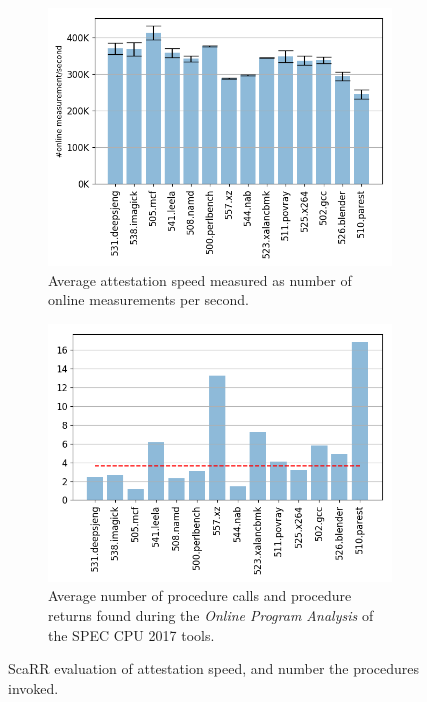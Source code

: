 \begin{figure}[t]
	\centering
	\begin{subfigure}[t]{0.45\textwidth}
		\centering
		\includegraphics[width=\textwidth]{fig_c4/attesetation_speed.png}
		\caption{Average attestation speed measured as number of online 
			measurements per second.}
		\label{fig:attesetation_speed}
	\end{subfigure} 
	\hfill
	\begin{subfigure}[t]{0.45\textwidth}
		\centering
		\includegraphics[width=\textwidth]{fig_c4/functioncall.png}
		\caption{Average number of procedure calls and procedure returns found 
		during the \emph{Online Program Analysis} of the SPEC CPU 2017 tools.}
		\label{fig:functioncall}
	\end{subfigure}
	\caption[ScaRR evaluation.]{ScaRR evaluation of attestation speed, and 
	number the procedures invoked.}
	\label{fig:scarr_evaluation}
\end{figure} 

